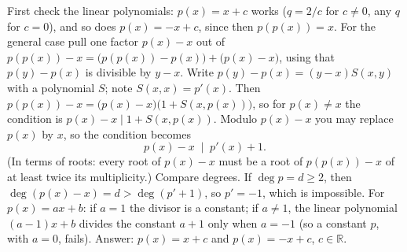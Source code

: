 \documentclass[11pt,a4paper]{article}
\begin{document}
 First check the linear polynomials: $p(x)=x+c$ works ($q=2/c$ for $c\ne0$, any $q$ for $c=0$), and so does $p(x)=-x+c$, since then $p(p(x))=x$. For the general case pull one factor $p(x)-x$ out of $p(p(x))-x=\bigl(p(p(x))-p(x)\bigr)+\bigl(p(x)-x\bigr)$, using that $p(y)-p(x)$ is divisible by $y-x$.
 Write $p(y)-p(x)=(y-x)S(x,y)$ with a polynomial $S$; note $S(x,x)=p'(x)$. Then $p(p(x))-x=\bigl(p(x)-x\bigr)\bigl(1+S(x,p(x))\bigr)$, so for $p(x)\ne x$ the condition is $p(x)-x\mid1+S(x,p(x))$. Modulo $p(x)-x$ you may replace $p(x)$ by $x$, so the condition becomes
\[p(x)-x\;\mid\;p'(x)+1.\]
(In terms of roots: every root of $p(x)-x$ must be a root of $p(p(x))-x$ of at least twice its multiplicity.)
 Compare degrees. If $\deg p=d\ge2$, then $\deg(p(x)-x)=d\gt\deg(p'+1)$, so $p'=-1$, which is impossible. For $p(x)=ax+b$: if $a=1$ the divisor is a constant; if $a\ne1$, the linear polynomial $(a-1)x+b$ divides the constant $a+1$ only when $a=-1$ (so a constant $p$, with $a=0$, fails). Answer: $p(x)=x+c$ and $p(x)=-x+c$, $c\in\mathbb R$.
\end{document}
